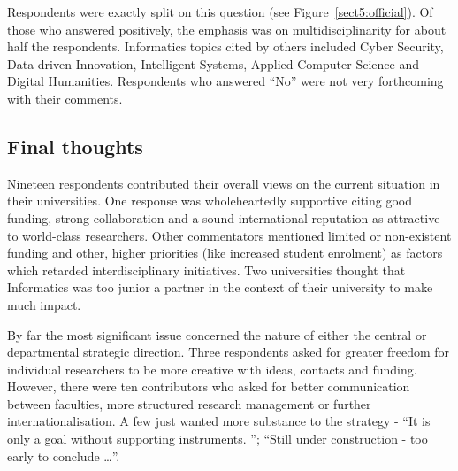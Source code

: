 Respondents were exactly split on this question (see Figure~\ref{sect5:official}). Of those who answered positively, the emphasis was on multidisciplinarity for about half the respondents. Informatics topics cited by others included Cyber Security, Data-driven Innovation, Intelligent Systems, Applied Computer Science and Digital Humanities. Respondents who answered ``No'' were not very forthcoming with their comments.

\subsection{Final thoughts}

Nineteen respondents contributed their overall views on the current situation in their universities. One response was wholeheartedly supportive citing good funding, strong collaboration and a sound international reputation as attractive to world-class researchers. Other commentators mentioned limited or non-existent funding and other, higher priorities (like increased student enrolment) as factors which retarded interdisciplinary initiatives. Two universities thought that Informatics was too junior a partner in the context of their university to make much impact.

By far the most significant issue concerned the nature of either the central or departmental strategic direction. Three respondents asked for greater freedom for individual researchers to be more creative with ideas, contacts and funding.  However, there were ten contributors who asked for better communication between faculties, more structured research management or further internationalisation. A few just wanted more substance to the strategy - ``It is only a goal without supporting instruments. '';  ``Still under construction - too early to conclude \ldots ''.




